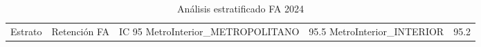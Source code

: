 \begin{table}
\caption{Análisis estratificado FA 2024}
\label{tab:fa_stratified}
\begin{tabular}{lcc}
\toprule
Estrato & Retención FA & IC 95%
\midrule
MetroInterior_METROPOLITANO & 95.5%
MetroInterior_INTERIOR & 95.2%
\bottomrule
\end{tabular}
\end{table}
